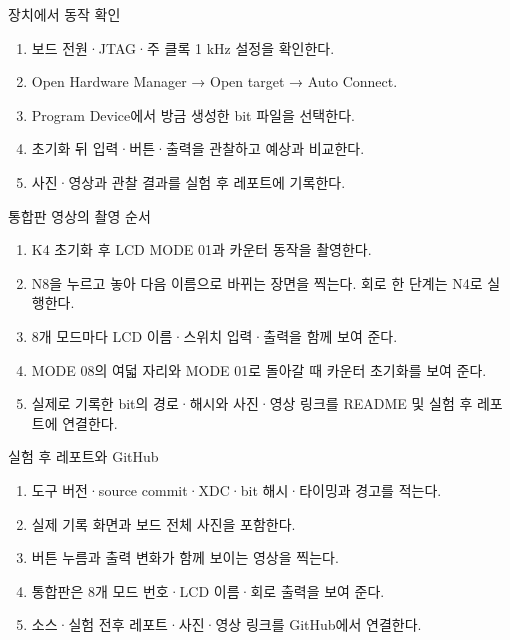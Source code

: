 \begin{frame}{장치에서 동작 확인}
\small
\begin{enumerate}
\item 보드 전원·JTAG·주 클록 1 kHz 설정을 확인한다.
\item Open Hardware Manager → Open target → Auto Connect.
\item Program Device에서 방금 생성한 bit 파일을 선택한다.
\item 초기화 뒤 입력·버튼·출력을 관찰하고 예상과 비교한다.
\item 사진·영상과 관찰 결과를 실험 후 레포트에 기록한다.
\end{enumerate}
\end{frame}

\begin{frame}{통합판 영상의 촬영 순서}
\small
\begin{enumerate}
\item K4 초기화 후 LCD MODE 01과 카운터 동작을 촬영한다.
\item N8을 누르고 놓아 다음 이름으로 바뀌는 장면을 찍는다. 회로 한 단계는 N4로 실행한다.
\item 8개 모드마다 LCD 이름·스위치 입력·출력을 함께 보여 준다.
\item MODE 08의 여덟 자리와 MODE 01로 돌아갈 때 카운터 초기화를 보여 준다.
\item 실제로 기록한 bit의 경로·해시와 사진·영상 링크를 README 및 실험 후 레포트에 연결한다.
\end{enumerate}
\end{frame}

\begin{frame}{실험 후 레포트와 GitHub}
\small
\begin{enumerate}
\item 도구 버전·source commit·XDC·bit 해시·타이밍과 경고를 적는다.
\item 실제 기록 화면과 보드 전체 사진을 포함한다.
\item 버튼 누름과 출력 변화가 함께 보이는 영상을 찍는다.
\item 통합판은 8개 모드 번호·LCD 이름·회로 출력을 보여 준다.
\item 소스·실험 전후 레포트·사진·영상 링크를 GitHub에서 연결한다.
\end{enumerate}
\end{frame}

